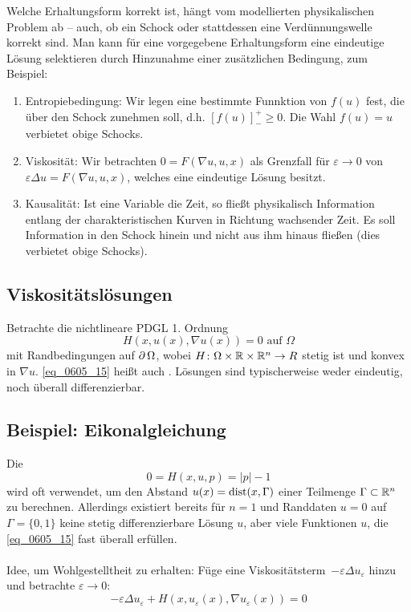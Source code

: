 	Welche Erhaltungsform korrekt ist, hängt vom modellierten physikalischen Problem ab -- auch, ob ein Schock oder stattdessen eine Verdünnungswelle korrekt sind. Man kann für eine vorgegebene Erhaltungsform eine eindeutige Lösung selektieren durch Hinzunahme einer zusätzlichen Bedingung, zum Beispiel: \begin{enumerate}
		\item Entropiebedingung: Wir legen eine bestimmte Funnktion von $f(u)$ fest, die über den Schock zunehmen soll, d.h. $[f(u)]_-^+ \geq 0$. Die Wahl $f(u) = u$ verbietet obige Schocks.
		\item Viskosität: Wir betrachten $0 = F(\nabla u, u, x)$ als Grenzfall für $\varepsilon \rightarrow 0$ von $\varepsilon \Delta u = F(\nabla u,u,x)$, welches eine eindeutige Lösung besitzt.
		\item Kausalität: Ist eine Variable die Zeit, so fließt physikalisch Information entlang der charakteristischen Kurven in Richtung wachsender Zeit. Es soll Information in den Schock hinein und nicht aus ihm hinaus fließen (dies verbietet obige Schocks).
	\end{enumerate}

\subsection{Viskositätslösungen}
	Betrachte die nichtlineare PDGL 1. Ordnung 
	\begin{equation}
		H(x,u(x),\nabla u(x)) = 0 \text{ auf } \Omega \label{eq_0605_15}
	\end{equation}
	mit Randbedingungen auf $\operatorname{\partial} \Omega$, wobei $H\colon \Omega \times \mathbb{R} \times \mathbb{R}^n \rightarrow R$ stetig ist und konvex in $\nabla u$. \eqref{eq_0605_15} heißt auch . Lösungen sind typischerweise weder eindeutig, noch überall differenzierbar.
	
\subsection{Beispiel: Eikonalgleichung}
\label{bsp_20}
	Die  \marginnote{[20]}
		\[ 0 = H(x,u,p) = |p|-1 \]
	wird oft verwendet, um den Abstand $u(x) = \operatorname{dist}(x,\Gamma)$ einer Teilmenge $\Gamma \subset \mathbb{R}^n$ zu berechnen. Allerdings existiert bereits für $n = 1$ und Randdaten $u = 0$ auf $\Gamma = \{0,1\}$ keine stetig differenzierbare Lösung $u$, aber viele Funktionen $u$, die \eqref{eq_0605_15} fast überall erfüllen. \\
	\mbox{} \\
	Idee, um Wohlgestelltheit zu erhalten: Füge eine \glqq Viskositätsterm\grqq \ $-\varepsilon \Delta u_\varepsilon$ hinzu und betrachte $\varepsilon \rightarrow 0$:
	\begin{equation}
		-\varepsilon \Delta u_\varepsilon + H(x,u_\varepsilon(x),\nabla u_\varepsilon (x)) = 0 \label{eq_0605_16}
	\end{equation}
	
